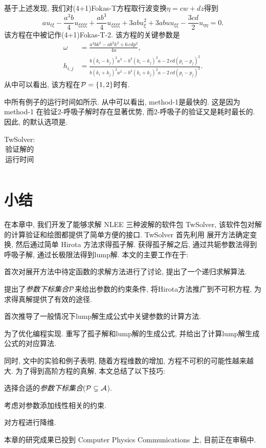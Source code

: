 基于上述发现, 我们对(4+1)Fokas-T方程取行波变换$\eta=cw+dz$得到
\begin{equation}
    au_{t\xi}-\frac{a^3b}{4}u_{\xi\xi\xi\xi}+\frac{ab^3}{4}u_{\xi\xi\xi\xi}+3abu_{\xi}^2+3abuu_{\xi\xi}-\frac{3cd}{2}u_{\eta\eta}=0.  \label{Fokas-T-2}
\end{equation}
该方程在中被记作(4+1)Fokas-T-2. 该方程的关键参数是
\begin{equation}
\begin{split}
    \omega&={\frac {{a}^{3}b{k}^{2}-a{b}^{3}{k}^{2}+6\,cd{p}^{2}}{4a}}, \\ 
    h_{{i,j}}&={\frac {b \left( k_{{i}}-k_{{j}} \right) ^{2}{a}^{3}-{b}^{3}
    \left( k_{{i}}-k_{{j}} \right) ^{2}a-2\,cd \left( p_{{i}}-p_{{j}}
    \right) ^{2}}{b \left( k_{{i}}+k_{{j}} \right) ^{2}{a}^{3}-{b}^{3}
    \left( k_{{i}}+k_{{j}} \right) ^{2}a-2\,cd \left( p_{{i}}-p_{{j}}
    \right) ^{2}}}.
\end{split}
\end{equation}
从中可以看出, 该方程在$\mathcal{P}=\{1,2\}$时有\TrueSol{}.

中所有例子的运行时间如所示. 从中可以看出, method-1是最快的. 这是因为 method-1 在验证2-呼吸子解时存在显著优势, 而2-呼吸子的验证又是耗时最长的. 因此, 的默认选项是. 

\begin{table}[htbp]
\centering 
\caption{TwSolver: 验证解的运行时间} \label{runtime}
\begin{tabular}{c|ccc|c}
\hline

\hline
\end{tabular}
\end{table}

\section{小结}
在本章中, 我们开发了能够求解 NLEE 三种波解的软件包 TwSolver, 该软件包对解的计算\D 验证和绘图都提供了简单方便的接口. TwSolver 首先利用 \Painleve{}展开方法确定变换, 然后通过简单 Hirota 方法求得孤子解. 获得孤子解之后, 通过共轭参数法得到呼吸子解, 通过长极限法得到lump解.  本文的主要工作在于: 
\begin{compactenum}[(1)]
\item 首次对\Painleve{}展开方法中待定函数的求解方法进行了讨论, 提出了一个递归求解算法. 
\item 提出了\emph{参数下标集合}$\mathcal{P}$来给出参数的约束条件, 将Hirota方法推广到不可积方程, 为求得真解提供了有效的途径. 
\item 首次推导了一般情况下lump解生成公式中关键参数的计算方法.
\item 为了优化编程实现. 重写了孤子解和lump解的生成公式, 并给出了计算lump解生成公式的对应算法.
\end{compactenum}

同时, 文中的实验和例子表明, 随着方程维数的增加, 方程不可积的可能性越来越大. 为了得到高阶方程的真解, 本文总结了以下技巧:
\begin{compactenum}[(1)]
\item 选择合适的\emph{参数下标集合}($\mathcal{P}\subsetneq  \mathcal{A}$). 
\item 考虑对参数添加线性相关的约束.
\item 对方程进行降维.
\end{compactenum}

本章的研究成果已投到 Computer Physics Communications 上, 目前正在审稿中. 
